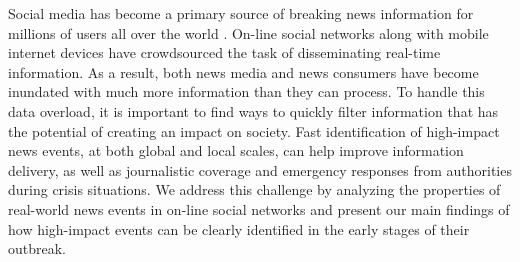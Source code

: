 \documentclass[10pt,letterpaper]{article}
\begin{document}
Social media has become a primary source of breaking news information
for millions of users all over the world \cite{Kwak:2010}. On-line
social networks along with mobile internet devices have crowdsourced
the task of disseminating real-time information. As a result, both
news media and news consumers have become inundated with much more
information than they can process. To handle this data overload, it is
important to find ways to quickly filter information that has the
potential of creating an impact on society. Fast identification of
high-impact news events, at both global and local scales, can help
improve information delivery, as well as journalistic coverage and
emergency responses from authorities during crisis situations. We
address this challenge by analyzing the properties of real-world news
events in on-line social networks and present our main findings of how
high-impact events can be clearly identified in the early stages of
their outbreak.

\end{document}
